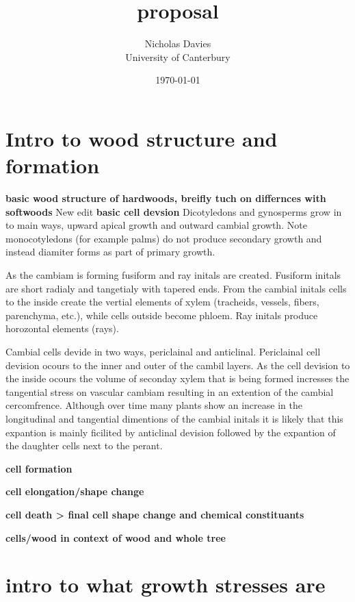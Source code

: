 \documentclass{article}
\begin{document}
\title{proposal}

\author{Nicholas Davies\\ University of Canterbury }

\date{\today}



\maketitle




\section{Intro to wood structure and formation}
\textbf{basic wood structure of hardwoods, breifly tuch on differnces with softwoods}
New edit
\textbf{basic cell devsion}
Dicotyledons and gynosperms grow in to main ways, upward apical growth and outward cambial growth. Note monocotyledons (for example palms) do not produce secondary growth and instead diamiter forms as part of primary growth.

As the cambiam is forming fusiform and ray initals are created. Fusiform initals are short radialy and tangetialy with tapered ends. From the cambial initals cells to the inside create the vertial elements of xylem (tracheids, vessels, fibers, parenchyma, etc.), while cells outside become phloem. Ray initals produce horozontal elements (rays).

Cambial cells devide in two ways, periclainal and anticlinal. Periclainal cell devision ocours to the inner and outer of the cambil layers. As the cell devision to the inside ocours the volume of seconday xylem that is being formed incresses the tangential stress on vascular cambiam resulting in an extention of the cambial cercomfrence. Although over time many plants show an increase in the longitudinal and tangential dimentions of the cambial initals it is likely that this expantion is mainly ficilited by anticlinal devision followed by the expantion of the daughter cells next to the perant.

\textbf{cell formation}

\textbf{cell elongation/shape change}

\textbf{cell death > final cell shape change and chemical constituants}

\textbf{cells/wood in context of wood and whole tree}




\section{intro to what growth stresses are}
\end{document}
